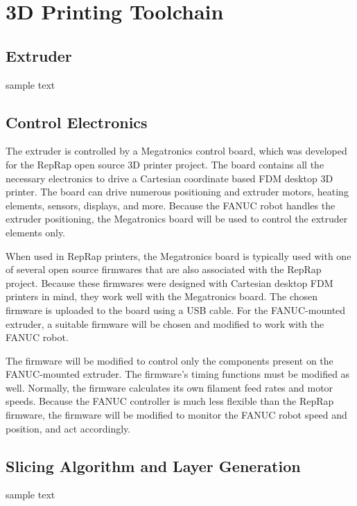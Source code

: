 \section{3D Printing Toolchain}

\subsection{Extruder}

\indent

sample text

\subsection{Control Electronics}

\indent
The extruder is controlled by a Megatronics control board, which was developed for the RepRap open source 3D printer project. The board contains all the necessary electronics to drive a Cartesian coordinate based FDM desktop 3D printer. The board can drive numerous positioning and extruder motors, heating elements, sensors, displays, and more. Because the FANUC robot handles the extruder positioning, the Megatronics board will be used to control the extruder elements only. 

When used in RepRap printers, the Megatronics board is typically used with one of several open source firmwares that are also associated with the RepRap project. Because these firmwares were designed with Cartesian desktop FDM printers in mind, they work well with the Megatronics board. The chosen firmware is uploaded to the board using a USB cable. For the FANUC-mounted extruder, a suitable firmware will be chosen and modified to work with the FANUC robot.

The firmware will be modified to control only the components present on the FANUC-mounted extruder. The firmware's timing functions must be modified as well. Normally, the firmware calculates its own filament feed rates and motor speeds. Because the FANUC controller is much less flexible than the RepRap firmware, the firmware will be modified to monitor the FANUC robot speed and position, and act accordingly. 

\subsection{Slicing Algorithm and Layer Generation}

\indent

sample text
